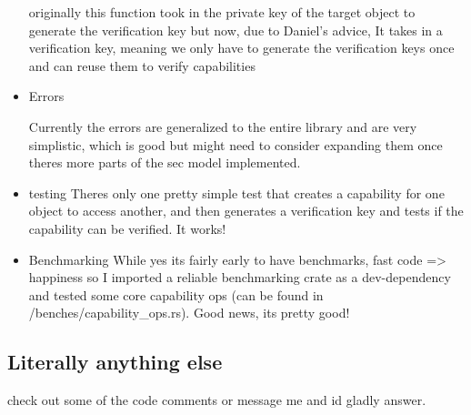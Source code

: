 \documentclass{article}
\begin{document}
\begin{itemize}
	      originally this function took in the private key of the target object to generate the
	      verification key but now, due to Daniel's advice, It takes in a verification
	      key, meaning we only have to generate the verification keys once and can reuse them
	      to verify capabilities
	\item Errors

	      Currently the errors are generalized to the entire library and are very
	      simplistic, which is good but might need to consider expanding them once
	      theres more parts of the sec model implemented.

	\item testing
	      Theres only one pretty simple test that creates a capability for one object to access another,
	      and then generates a verification key and tests if the capability can be verified. It works!

	\item Benchmarking
	      While yes its fairly early to have benchmarks, fast code => happiness so I imported
	      a reliable benchmarking crate as a dev-dependency and tested
	      some core capability ops (can be found in /benches/capability_ops.rs).
	      Good news, its pretty good!
\end{itemize}


\subsection{Literally anything else}
check out some of the code comments or message me and id gladly answer.
\end{document}
